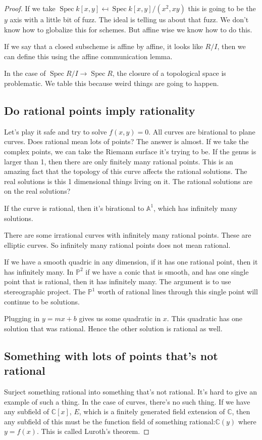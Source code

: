 \documentclass{book}
\newcommand{\C}{\ensuremath{\mathbb{C}}}
\renewcommand{\P}{\ensuremath{\mathbb{P}}}
\newcommand{\A}{\ensuremath{\mathbb{A}}}
\newcommand{\spec}{\operatorname{Spec}}
\theoremstyle{definition}
\begin{document}
\begin{proof}
If we take $\spec k[x, y] \mapsfrom \spec k[x, y]/(x^2, xy)$ this is going to be
the $y$ axis with a little bit of fuzz. The ideal is telling us about that fuzz.
We don't know how to globalize this for schemes. But affine wise we know how to
do this. 

If we say that a closed subscheme is affine by affine, it looks like $R/I$, then
we can define this using the affine communication lemma.


In the case of $\spec R/I \rightarrow \spec R$, the closure of a topological space
is problematic. We table this because weird things are going to happen.

\subsection{Do rational points imply rationality}

Let's play it safe and try to solve $f(x, y) = 0$. All curves are birational
to plane curves.  Does rational mean lots of points? The answer is almost.
If we take the complex points, we can take the Riemann surface it's trying to be.
If the genus is larger than 1, then there are only finitely many rational points.
This is an amazing fact that the topology of this curve affects the rational solutions.
The real solutions is this 1 dimensional things living on it. The rational
solutions are on the real solutions? 

If the curve is rational, then it's birational to $\A^1$, which has infinitely
many solutions.


There are some irrational curves with infinitely many rational points. These
are elliptic curves. So infinitely many rational points does not mean rational.


If we have a smooth quadric in any dimension, if it has one rational point,
then it has infinitely many. In $\P^2$ if we have a conic that is smooth,
and has one single point that is rational, then it has infinitely many. The
argument is to use stereographic project. The $\P^1$ worth of rational lines
through this single point will continue to be solutions.

Plugging in $y = mx+b$ gives us some quadratic in $x$. This quadratic has one
solution that was rational. Hence the other solution is rational as well.


\subsection{Something with lots of points that's not rational}
Surject something rational into something that's not rational. It's hard to
give an example of such a thing. In the case of curves, there's no such thing.
If we have any subfield of $\C[x]$, $E$, which is a finitely generated field
extension of $\C$, then any subfield of this
must be the function field of something rational:$\C(y)$ where $y = f(x)$. This
is called Luroth's theorem.


\end{proof}
\end{document}
